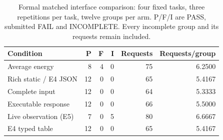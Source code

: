 \begin{table}[htbp]
\centering\small
\caption{Formal matched interface comparison: four fixed tasks, three repetitions per task, twelve groups per arm. P/F/I are PASS, submitted FAIL and INCOMPLETE. Every incomplete group and its requests remain included.}
\label{tab:formal}
\begin{tabular}{@{}lrrrrr@{}}\toprule
Condition & P & F & I & Requests & Requests/group \\\midrule
Average energy & 8 & 4 & 0 & 75 & 6.2500 \\
Rich static / E4 JSON & 12 & 0 & 0 & 65 & 5.4167 \\
Complete input & 12 & 0 & 0 & 64 & 5.3333 \\
Executable response & 12 & 0 & 0 & 66 & 5.5000 \\
Live observation (E5) & 7 & 0 & 5 & 80 & 6.6667 \\
E4 typed table & 12 & 0 & 0 & 65 & 5.4167 \\
\bottomrule\end{tabular}
\end{table}
